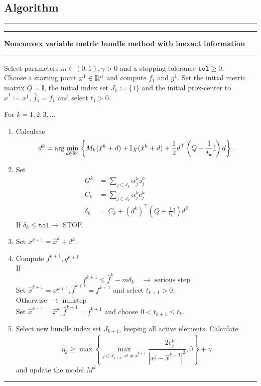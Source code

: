 \subsection{Algorithm}
\vspace{1em}

\hrule  \vspace{0.4ex} \hrule
\vspace{1ex}
\textbf{Nonconvex variable metric bundle method with inexact information}
\vspace{1ex}
\hrule
\vspace{1ex}
Select parameters \( m \in (0,1), \gamma > 0 \) and a stopping tolerance \( \mathtt{tol} \geq 0\). \\
Choose a starting point \(x^1 \in \mathbb{R}^n\) and compute \(f_1\) and \(g^1\). Set the initial metric matrix \(Q = \mathbb{I}\), the initial index set \(J_1:=\{1\}\) and the initial prox-center to \(\hat{x}^1 := x^1\), \(\hat{f}_1 = f_1\) and select \(t_1 > 0\).

For \(k = 1,2,3,  \dotsc \)   

\begin{enumerate}
	\item Calculate \[d^k = \arg \min_{d \in \mathbb{R}^n} \left\{ M_k(\hat{x}^k+d)+\mathbb{I}_X(\hat{x}^k+d)+\frac{1}{2}d^{\top}\left(Q+\frac{1}{t_k}\mathbb{I}\right)d\right\}.\]
	\item Set %
		\begin{align*} 
		  G^k &= \sum_{j \in J_k}{\alpha_j^k s_j^k} \\ %
			C_k &= \sum_{j \in J_k}{\alpha_j^k c_j^k} \\
	    \delta_k &=  C_k + (d^k)^{\top}\left(Q+\frac{1}{t_k}\mathbb{I}\right)d^k
		\end{align*}
		If \(\delta_k \leq \mathtt{tol} \rightarrow \) STOP.
	\item Set \( x^{k+1} = \hat{x}^k + d^k \).
	\item Compute \(f^{k+1}, g^{k+1}\) \\
	If 
	\[f^{k+1} \leq \hat{f}^k - m\delta_k \quad \rightarrow \text{ serious step} \]
	Set \(\hat{x}^{k+1} = x^{k+1}, \hat{f}^{k+1} = f^{k+1}\) and select \(t_{k+1} > 0\). \\
	Otherwise \(\rightarrow\) nullstep \\
	Set \(\hat{x}^{k+1} = \hat{x}^k, \hat{f}^{k+1}=f^{k+1}\) and choose \(0 < t_{k+1} \leq t_k\). 	
	\item Select new bundle index set \(J_{k+1}\), keeping all active elements. Calculate 
	\[ \eta_k \geq \max{\left\{\max_{j \in J_{k+1}, x^j \neq \hat{x}^{k+1}}{\frac{-2e_j^k}{|x^j - \hat{x}^{k+1}|^2}, 0}\right\}}+\gamma  \]
	and update the model \(M^k\)
\end{enumerate}
\vspace{1ex}
\hrule

